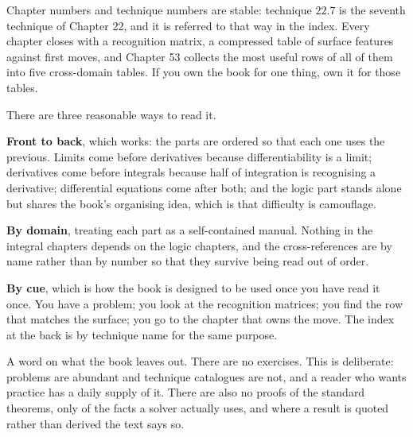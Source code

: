 Chapter numbers and technique numbers are stable: technique $22.7$ is the
seventh technique of Chapter 22, and it is referred to that way in the index.
Every chapter closes with a recognition matrix, a compressed table of surface
features against first moves, and Chapter 53 collects the most useful rows of
all of them into five cross-domain tables. If you own the book for one thing,
own it for those tables.

There are three reasonable ways to read it.

\textbf{Front to back}, which works: the parts are ordered so that each one
uses the previous. Limits come before derivatives because differentiability is
a limit; derivatives come before integrals because half of integration is
recognising a derivative; differential equations come after both; and the
logic part stands alone but shares the book's organising idea, which is that
difficulty is camouflage.

\textbf{By domain}, treating each part as a self-contained manual. Nothing in
the integral chapters depends on the logic chapters, and the cross-references
are by name rather than by number so that they survive being read out of
order.

\textbf{By cue}, which is how the book is designed to be used once you have
read it once. You have a problem; you look at the recognition matrices; you
find the row that matches the surface; you go to the chapter that owns the
move. The index at the back is by technique name for the same purpose.

A word on what the book leaves out. There are no exercises. This is deliberate:
problems are abundant and technique catalogues are not, and a reader who wants
practice has a daily supply of it. There are also no proofs of the standard
theorems, only of the facts a solver actually uses, and where a result is
quoted rather than derived the text says so.

\clearpage
